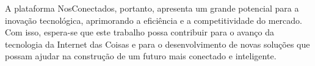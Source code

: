 \documentclass[tcc,capa]{texufpel}
\begin{document}
A plataforma NosConectados, portanto, apresenta um grande potencial para a inovação tecnológica, aprimorando a eficiência e a competitividade do mercado. Com isso, espera-se que este trabalho possa contribuir para o avanço da tecnologia da Internet das Coisas e para o desenvolvimento de novas soluções que possam ajudar na construção de um futuro mais conectado e inteligente.


 




\end{document}
